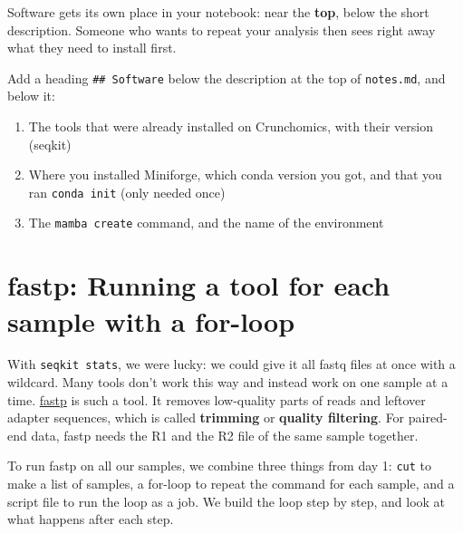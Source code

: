 \documentclass[
  letterpaper,
  DIV=11,
  numbers=noendperiod]{scrreprt}
\providecommand{\tightlist}{%
  \setlength{\itemsep}{0pt}\setlength{\parskip}{0pt}}
\begin{document}
\begin{tcolorbox}[enhanced jigsaw, colbacktitle=quarto-callout-color!10!white, rightrule=.15mm, leftrule=.75mm, colback=white, opacitybacktitle=0.6, title=\textcolor{quarto-callout-color}{\faInfo}\hspace{0.5em}{Notebook checkpoint: Installing fastp}, bottomrule=.15mm, left=2mm, colframe=quarto-callout-color-frame, opacityback=0, breakable, bottomtitle=1mm, coltitle=black, arc=.35mm, toprule=.15mm, toptitle=1mm, titlerule=0mm]

Software gets its own place in your notebook: near the \textbf{top},
below the short description. Someone who wants to repeat your analysis
then sees right away what they need to install first.

Add a heading \texttt{\#\#\ Software} below the description at the top
of \texttt{notes.md}, and below it:

\begin{enumerate}
\def\labelenumi{\arabic{enumi}.}
\tightlist
\item
  The tools that were already installed on Crunchomics, with their
  version (seqkit)
\item
  Where you installed Miniforge, which conda version you got, and that
  you ran \texttt{conda\ init} (only needed once)
\item
  The \texttt{mamba\ create} command, and the name of the environment
\end{enumerate}

\end{tcolorbox}

\section{fastp: Running a tool for each sample with a
for-loop}\label{fastp-running-a-tool-for-each-sample-with-a-for-loop}

With \texttt{seqkit\ stats}, we were lucky: we could give it all fastq
files at once with a wildcard. Many tools don't work this way and
instead work on one sample at a time.
\href{https://github.com/OpenGene/fastp}{fastp} is such a tool. It
removes low-quality parts of reads and leftover adapter sequences, which
is called \textbf{trimming} or \textbf{quality filtering}. For
paired-end data, fastp needs the R1 and the R2 file of the same sample
together.

To run fastp on all our samples, we combine three things from day 1:
\texttt{cut} to make a list of samples, a for-loop to repeat the command
for each sample, and a script file to run the loop as a job. We build
the loop step by step, and look at what happens after each step.
\end{document}
